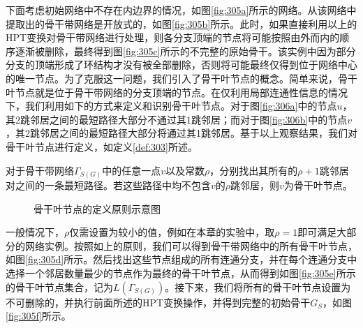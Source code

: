 下面考虑初始网络中不存在内边界的情况，如图\ref{fig:305a}所示的网络。从该网络中提取出的骨干带网络是开放式的，如图\ref{fig:305b}所示。此时，如果直接利用以上的HPT变换对骨干带网络进行处理，则各分支顶端的节点将可能按照由外而内的顺序逐渐被删除，最终得到图\ref{fig:305c}所示的不完整的原始骨干。该实例中因为部分分支的顶端形成了环结构才没有被全部删除，否则将可能最终仅得到位于网络中心的唯一节点。为了克服这一问题，我们引入了骨干叶节点的概念。简单来说，骨干叶节点就是位于骨干带网络的分支顶端的节点。在仅利用局部连通性信息的情况下，我们利用如下的方式来定义和识别骨干叶节点。对于图\ref{fig:306a}中的节点$u$，其2跳邻居之间的最短路径大部分不通过其1跳邻居；而对于图\ref{fig:306b}中的节点$v$，其2跳邻居之间的最短路径大部分将通过其1跳邻居。基于以上观察结果，我们对骨干叶节点进行定义，如定义\ref{def:303}所述。
\begin{definition}\label{def:303}
对于骨干带网络$\Gamma_{S(G)}$中的任意一点$v$以及常数$\rho$，分别找出其所有的$\rho+1$跳邻居对之间的一条最短路径。若这些路径中均不包含$v$的$\rho$跳邻居，则$v$为骨干叶节点。
\end{definition}
\begin{figure}[h]
  \centering
  \hspace{0.5em}%
\caption{骨干叶节点的定义原则示意图}
\label{fig:306}
\end{figure}

一般情况下，$\rho$仅需设置为较小的值，例如在本章的实验中，取$\rho=1$即可满足大部分的网络实例。按照如上的原则，我们可以得到骨干带网络中的所有骨干叶节点，如图\ref{fig:305d}所示。然后找出这些节点组成的所有连通分支，并在每个连通分支中选择一个邻居数量最少的节点作为最终的骨干叶节点，从而得到如图\ref{fig:305e}所示的骨干叶节点集合，记为$L(\Gamma_{S(G)})$。接下来，我们将所有的骨干叶节点设置为不可删除的，并执行前面所述的HPT变换操作，并得到完整的初始骨干$G_S$，如图\ref{fig:305f}所示。

